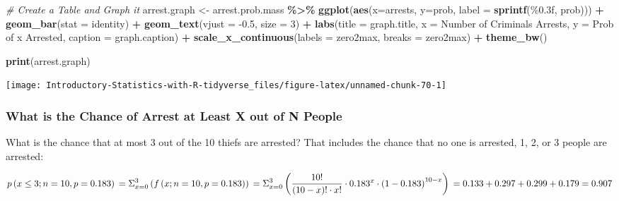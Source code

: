 \documentclass[
]{book}
\newenvironment{Shaded}{\begin{snugshade}}{\end{snugshade}}
\newcommand{\CommentTok}[1]{\textcolor[rgb]{0.56,0.35,0.01}{\textit{#1}}}
\newcommand{\DataTypeTok}[1]{\textcolor[rgb]{0.13,0.29,0.53}{#1}}
\newcommand{\DecValTok}[1]{\textcolor[rgb]{0.00,0.00,0.81}{#1}}
\newcommand{\FloatTok}[1]{\textcolor[rgb]{0.00,0.00,0.81}{#1}}
\newcommand{\KeywordTok}[1]{\textcolor[rgb]{0.13,0.29,0.53}{\textbf{#1}}}
\newcommand{\NormalTok}[1]{#1}
\newcommand{\OperatorTok}[1]{\textcolor[rgb]{0.81,0.36,0.00}{\textbf{#1}}}
\newcommand{\StringTok}[1]{\textcolor[rgb]{0.31,0.60,0.02}{#1}}
\begin{document}
\begin{Shaded}
\begin{Highlighting}[]
\CommentTok{\# Create a Table and Graph it}
\NormalTok{arrest.graph \textless{}{-}}\StringTok{ }\NormalTok{arrest.prob.mass }\OperatorTok{\%\textgreater{}\%}
\StringTok{    }\KeywordTok{ggplot}\NormalTok{(}\KeywordTok{aes}\NormalTok{(}\DataTypeTok{x=}\NormalTok{arrests, }\DataTypeTok{y=}\NormalTok{prob, }\DataTypeTok{label =} \KeywordTok{sprintf}\NormalTok{(}\StringTok{\textquotesingle{}\%0.3f\textquotesingle{}}\NormalTok{, prob))) }\OperatorTok{+}
\StringTok{    }\KeywordTok{geom\_bar}\NormalTok{(}\DataTypeTok{stat =} \StringTok{\textquotesingle{}identity\textquotesingle{}}\NormalTok{) }\OperatorTok{+}
\StringTok{    }\KeywordTok{geom\_text}\NormalTok{(}\DataTypeTok{vjust =} \FloatTok{{-}0.5}\NormalTok{, }\DataTypeTok{size =} \DecValTok{3}\NormalTok{) }\OperatorTok{+}
\StringTok{    }\KeywordTok{labs}\NormalTok{(}\DataTypeTok{title =}\NormalTok{ graph.title,}
         \DataTypeTok{x =} \StringTok{\textquotesingle{}Number of Criminals Arrests\textquotesingle{}}\NormalTok{,}
         \DataTypeTok{y =} \StringTok{\textquotesingle{}Prob of x Arrested\textquotesingle{}}\NormalTok{,}
         \DataTypeTok{caption =}\NormalTok{ graph.caption) }\OperatorTok{+}
\StringTok{    }\KeywordTok{scale\_x\_continuous}\NormalTok{(}\DataTypeTok{labels =}\NormalTok{ zero2max, }\DataTypeTok{breaks =}\NormalTok{ zero2max) }\OperatorTok{+}
\StringTok{    }\KeywordTok{theme\_bw}\NormalTok{()}

\KeywordTok{print}\NormalTok{(arrest.graph)}
\end{Highlighting}
\end{Shaded}

\begin{center}\texttt{[image: Introductory-Statistics-with-R-tidyverse\_files/figure-latex/unnamed-chunk-70-1]} \end{center}

\hypertarget{what-is-the-chance-of-arrest-at-least-x-out-of-n-people}{%
\subsubsection{What is the Chance of Arrest at Least X out of N People}\label{what-is-the-chance-of-arrest-at-least-x-out-of-n-people}}

What is the chance that at most 3 out of the 10 thiefs are arrested? That includes the chance that no one is arrested, 1, 2, or 3 people are arrested:

\[
 p\left(x \le 3;n=10,p=0.183\right) \\
=\Sigma_{x=0}^{3} \left( f\left(x;n=10,p=0.183\right) \right) \\
=\Sigma_{x=0}^3 \left( \frac{10!}{\left(10-x\right)! \cdot x!} \cdot 0.183^x \cdot \left(1-0.183\right)^{10-x} \right)\\
=0.133 + 0.297 + 0.299 + 0.179\\
=0.907\\
\]
\end{document}
